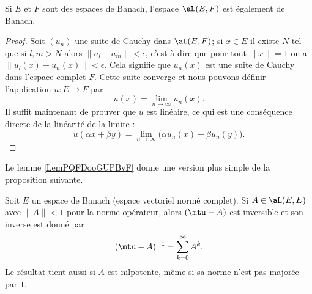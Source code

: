 \begin{lemma}       \label{LemCAIPooPMNbXg}
    Si \( E\) et \( F\) sont des espaces de Banach, l'espace \( \aL(E,F)\) est également de Banach.
\end{lemma}

\begin{proof}
    Soit \( (u_n)\) une suite de Cauchy dans \( \aL(E,F)\); si \( x\in E\) il existe \( N\) tel que si \( l,m>N\) alors \( \| a_l-a_m \|<\epsilon\), c'est à dire que pour tout \( \| x \|=1\) on a \( \| u_l(x)-u_n(x) \|<\epsilon\). Cela signifie que \( u_n(x)\) est une suite de Cauchy dans l'espace complet \( F\). Cette suite converge et nous pouvons définir l'application \( u\colon E\to F\) par
    \begin{equation}
        u(x)=\lim_{n\to \infty} u_n(x).
    \end{equation}
    Il suffit maintenant de prouver que \( u\) est linéaire, ce qui est une conséquence directe de la linéarité de la limite :
    \begin{equation}
        u(\alpha x+\beta y)=\lim_{n\to \infty} \big( \alpha u_n(x)+\beta u_n(y) \big).
    \end{equation}
\end{proof}

Le lemme \ref{LemPQFDooGUPBvF} donne une version plus simple de la proposition suivante.
\begin{proposition}     \label{PropQAjqUNp}
    Soit \( E\) un espace de Banach (espace vectoriel normé complet). Si \( A\in\aL(E,E)\) avec \( \| A \|<1\) pour la norme opérateur, alors \( (\mtu-A)\) est inversible et son inverse est donné par
    \begin{equation}
        (\mtu-A)^{-1}=\sum_{k=0}^{\infty}A^k.
    \end{equation}
    Le résultat tient aussi si \( A\) est nilpotente, même si sa norme n'est pas majorée par \( 1\).
\end{proposition}

